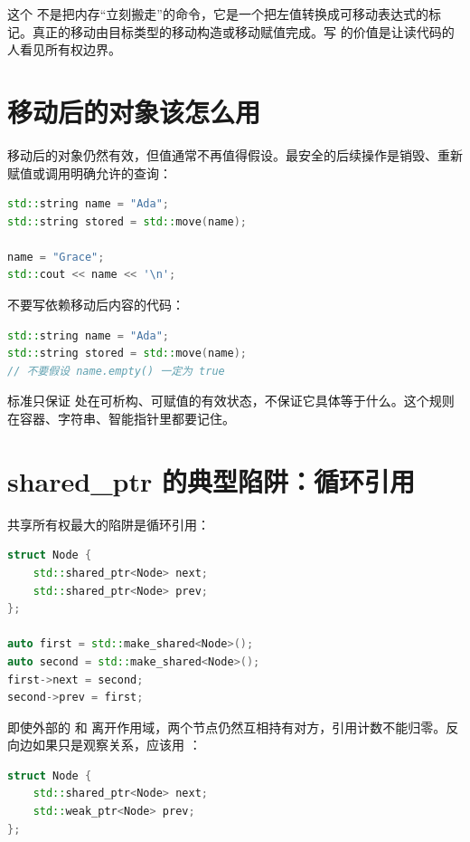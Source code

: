 这个  不是把内存“立刻搬走”的命令，它是一个把左值转换成可移动表达式的标记。真正的移动由目标类型的移动构造或移动赋值完成。写  的价值是让读代码的人看见所有权边界。

\section{移动后的对象该怎么用}

移动后的对象仍然有效，但值通常不再值得假设。最安全的后续操作是销毁、重新赋值或调用明确允许的查询：

\begin{lstlisting}[language=C++,caption={移动后重新赋值再使用}]
std::string name = "Ada";
std::string stored = std::move(name);

name = "Grace";
std::cout << name << '\n';
\end{lstlisting}

不要写依赖移动后内容的代码：

\begin{lstlisting}[language=C++,caption={不要依赖移动后的旧内容}]
std::string name = "Ada";
std::string stored = std::move(name);
// 不要假设 name.empty() 一定为 true
\end{lstlisting}

标准只保证  处在可析构、可赋值的有效状态，不保证它具体等于什么。这个规则在容器、字符串、智能指针里都要记住。

\section{shared\_ptr 的典型陷阱：循环引用}

共享所有权最大的陷阱是循环引用：

\begin{lstlisting}[language=C++,caption={共享指针循环引用会阻止释放}]
struct Node {
    std::shared_ptr<Node> next;
    std::shared_ptr<Node> prev;
};

auto first = std::make_shared<Node>();
auto second = std::make_shared<Node>();
first->next = second;
second->prev = first;
\end{lstlisting}

即使外部的  和  离开作用域，两个节点仍然互相持有对方，引用计数不能归零。反向边如果只是观察关系，应该用 ：

\begin{lstlisting}[language=C++,caption={弱指针表达非拥有反向引用}]
struct Node {
    std::shared_ptr<Node> next;
    std::weak_ptr<Node> prev;
};
\end{lstlisting}


